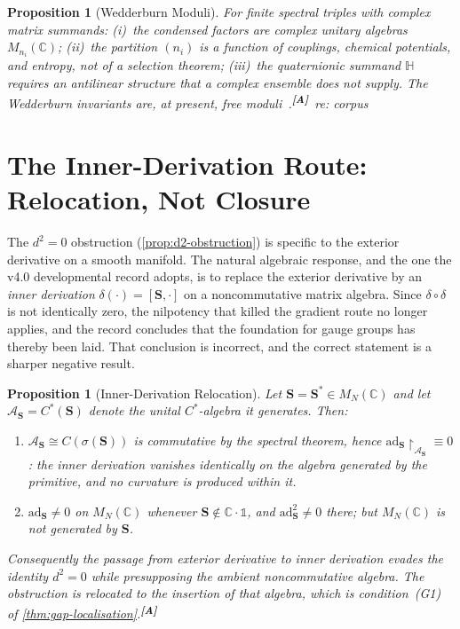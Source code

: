\documentclass[12pt,a4paper,twoside]{article}
\theoremstyle{plain}
\newtheorem{proposition}[theorem]{Proposition}
\theoremstyle{definition}
\theoremstyle{remark}
\newcommand{\catmark}[1]{\textsuperscript{\textsf{\textbf{[#1]}}}}
\begin{document}
\begin{proposition}[Wedderburn Moduli]
\label{prop:wedderburn-moduli}
For finite spectral triples with complex matrix summands: (i)~the
condensed factors are complex unitary algebras $M_{n_i}(\mathbb C)$;
(ii)~the partition $(n_i)$ is a function of couplings, chemical
potentials, and entropy, not of a selection theorem; (iii)~the
quaternionic summand $\mathbb H$ requires an antilinear structure that a
complex ensemble does not supply. The Wedderburn invariants are, at
present, free moduli~\cite{cacic2011}.\catmark{A}\ \emph{re: corpus}
\end{proposition}

\newpage
\section{The Inner-Derivation Route: Relocation, Not Closure}
\label{sec:inner-derivation}

\noindent The $d^2 = 0$ obstruction (\cref{prop:d2-obstruction}) is
specific to the exterior derivative on a smooth manifold. The natural
algebraic response, and the one the v4.0 developmental record adopts, is
to replace the exterior derivative by an \emph{inner derivation}
$\delta(\cdot) = [\mathbf S, \cdot]$ on a noncommutative matrix algebra.
Since $\delta \circ \delta$ is not identically zero, the nilpotency that
killed the gradient route no longer applies, and the record concludes
that the foundation for gauge groups has thereby been laid. That
conclusion is incorrect, and the correct statement is a sharper negative
result.

\begin{proposition}[Inner-Derivation Relocation]
\label{prop:inner-derivation}
Let $\mathbf S = \mathbf S^{\ast} \in M_N(\mathbb C)$ and let
$\mathcal A_{\mathbf S} = C^{\ast}(\mathbf S)$ denote the unital
$C^{\ast}$-algebra it generates. Then:
\begin{enumerate}[label=(\roman*),leftmargin=2.2em,itemsep=0.15em]
\item $\mathcal A_{\mathbf S} \cong C(\sigma(\mathbf S))$ is commutative
by the spectral theorem, hence $\mathrm{ad}_{\mathbf
S}\!\restriction_{\mathcal A_{\mathbf S}} \equiv 0$: the inner derivation
vanishes identically on the algebra generated by the primitive, and no
curvature is produced within it.
\item $\mathrm{ad}_{\mathbf S} \neq 0$ on $M_N(\mathbb C)$ whenever
$\mathbf S \notin \mathbb C\!\cdot\!\mathbb 1$, and
$\mathrm{ad}_{\mathbf S}^{2} \neq 0$ there; but $M_N(\mathbb C)$ is not
generated by $\mathbf S$.
\end{enumerate}
Consequently the passage from exterior derivative to inner derivation
evades the identity $d^2=0$ while presupposing the ambient noncommutative
algebra. The obstruction is relocated to the insertion of that algebra,
which is condition~(G1) of \cref{thm:gap-localisation}.\catmark{A}
\end{proposition}
\end{document}
